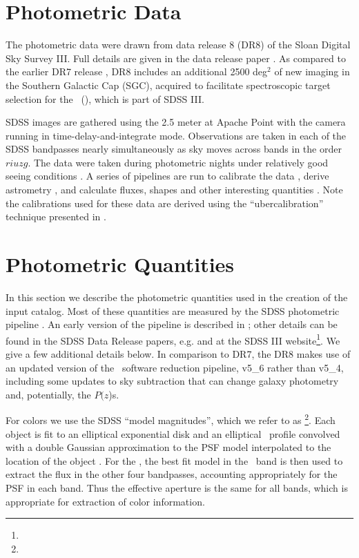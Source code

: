 \documentclass[12pt,preprint]{aastex}
\newcommand{\pofz}{$P(z$)}
\begin{document}
\section{Photometric Data} \label{sec:data}

The photometric data were drawn from data release 8 (DR8) of the Sloan Digital
Sky Survey III.  Full details are given in the data release paper \citet{dr8}.
As compared to the earlier DR7 release \citep{dr7}, DR8 includes an additional
2500 deg$^2$ of new imaging in the Southern Galactic Cap (SGC), acquired to
facilitate spectroscopic target selection for the \bossfull\ (\boss), which is
part of SDSS III.


SDSS \citep{York00} images are gathered using the 2.5 meter at Apache Point
\citep{Gunn06} with the camera \citep{Gunn98} running in
time-delay-and-integrate mode.  Observations are taken in each of the SDSS
bandpasses \citep[{\it ugriz};][]{Fukugita96} nearly simultaneously as sky
moves across bands in the order $riuzg$.  The data were taken during
photometric nights under relatively good seeing conditions \citep{Hogg01}.  A
series of pipelines are run to calibrate the data
\citep{Nikhil08,Smith02,Tucker06}, derive astrometry \citep{Pier03}, and
calculate fluxes, shapes and other interesting quantities
\citep{LuptonADASS01}.  Note the calibrations used for these data are derived
using the ``ubercalibration'' technique presented in \citet{Nikhil08}.
\section{Photometric Quantities} \label{sec:photo}

In this section we describe the photometric quantities used in the creation of the
input catalog.  Most of these quantities are measured by the SDSS photometric
pipeline \photo. An early version of the pipeline is described in
\citet{LuptonADASS01};  other details can be found in the SDSS Data Release
papers, e.g. \citet{dr4} and at the SDSS III website\footnote{\sdssweb}.  We
 give a few additional details below.  In comparison to DR7, the DR8
makes use of an updated version of the \photo\ software reduction pipeline,
v5\_6 rather than v5\_4, including some updates to sky subtraction that can
change galaxy photometry and, potentially, the \pofz s.

For colors we use the SDSS ``model magnitudes'', which we refer to as
\modelmag \footnote{\DRatemags}.  Each object is fit to an elliptical
exponential disk and an elliptical \devauc\ profile convolved with a double
Gaussian approximation to the PSF model interpolated to the location of the
object \citep{LuptonADASS01,Sheldon04}.  For the \modelmag, the best fit model
in the \rmag\ band is then used to extract the flux in the other four
bandpasses, accounting appropriately for the PSF in each band. Thus the
effective aperture is the same for all bands, which is appropriate for
extraction of color information.
\end{document}
